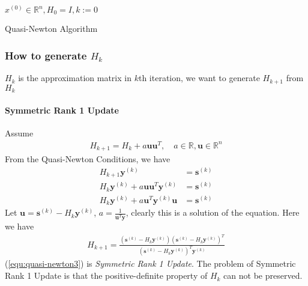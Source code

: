 \begin{algorithm}[H]
    \SetAlgoLined
     $x^{(0)} \in \mathbb{R}^n, H_0 = I, k:= 0$\;
     \caption{Quasi-Newton Algorithm}
\end{algorithm}
\vspace{.3em}
\subsubsection{How to generate $H_k$}
\par
$H_k$ is the approximation matrix in $k$th iteration, we want to
generate $H_{k+1}$ from $H_k$
\paragraph{Symmetric Rank 1 Update}
Assume
\begin{align}
    H_{k+1} = H_k + a \mathbf{u}\mathbf{u}^T,
     \quad a \in \mathbb{R}, \mathbf{u} \in \mathbb{R}^n
\end{align}
From the Quasi-Newton Conditions, we have
\begin{align}
    H_{k+1} \mathbf{y}^{(k)} &= \mathbf{s}^{(k)} \\
    H_k \mathbf{y}^{(k)} + a \mathbf{u}\mathbf{u}^T \mathbf{y}^{(k)}
    &= \mathbf{s}^{(k)} \\
    H_k \mathbf{y}^{(k)} + a \mathbf{u}^T\mathbf{y}^{(k)} \mathbf{u} 
    &= \mathbf{s}^{(k)}
\end{align}
Let $\mathbf{u} = \mathbf{s}^{(k)} - H_k \mathbf{y}^{(k)}$, 
$a = \frac{1}{\mathbf{u}^T \mathbf{y}}$,
clearly this is a solution of the equation.
Here we have
\begin{align}
    H_{k+1} = \frac{(\mathbf{s}^{(k)} - H_k \mathbf{y}^{(k)})
    (\mathbf{s}^{(k)} - H_k \mathbf{y}^{(k)})^T}
    {(\mathbf{s}^{(k)} - H_k \mathbf{y}^{(k)})^T \mathbf{y}^{(k)}}
    \label{equ:quasi-newton3}
\end{align}
(\ref{equ:quasi-newton3}) is \textit{Symmetric Rank 1 Update}.
The problem of Symmetric Rank 1 Update is that
the positive-definite property of $H_k$
can not be preserved.

